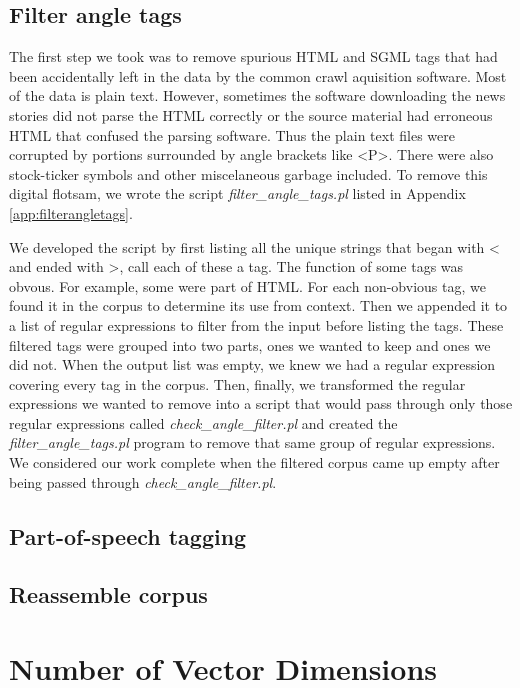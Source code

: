 \documentclass[10pt,letterpaper]{book}
\newcommand{\filename}[1]{\textit{#1}}
\begin{document}
\subsection{Filter angle tags}

The first step we took was to remove spurious HTML and SGML tags that had been accidentally left in the data by the common crawl aquisition software. Most of the data is plain text. However, sometimes the software downloading the news stories did not parse the HTML correctly or the source material had erroneous HTML that confused the parsing software. Thus the plain text files were corrupted by portions surrounded by angle brackets like <P>. There were also stock-ticker symbols and other miscelaneous garbage included. To remove this digital flotsam, we wrote the script \filename{filter\_angle\_tags.pl} listed in Appendix \ref{app:filterangletags}.

We developed the script by first listing all the unique strings that began with < and ended with >, call each of these a tag. The function of some tags was obvous. For example, some were part of HTML. For each non-obvious tag, we found it in the corpus to determine its use from context. Then we appended it to a list of regular expressions to filter from the input before listing the tags. These filtered tags were grouped into two parts, ones we wanted to keep and ones we did not. When the output list was empty, we knew we had a regular expression covering every tag in the corpus. Then, finally, we transformed the regular expressions we wanted to remove into a script that would pass through only those regular expressions called \filename{check\_angle\_filter.pl} and created the \filename{filter\_angle\_tags.pl} program to remove that same group of regular expressions. We considered our work complete when the filtered corpus came up empty after being passed through \filename{check\_angle\_filter.pl}.

\subsection{Part-of-speech tagging}



\subsection{Reassemble corpus}

\section{Number of Vector Dimensions}
\end{document}
